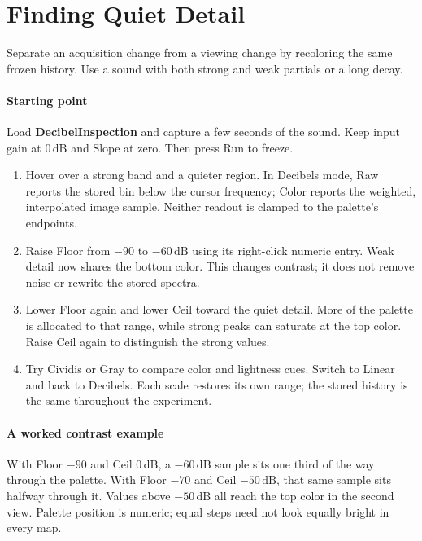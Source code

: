 \section{Finding Quiet Detail}\label{sec:detail}

Separate an acquisition change from a viewing change by recoloring the same
frozen history. Use a sound with both strong and weak partials or a long decay.

\paragraph{Starting point}
Load \textbf{DecibelInspection} and capture a few seconds of the sound.
Keep input gain at $0\,\mathrm{dB}$ and Slope at zero. Then press Run to freeze.

\begin{enumerate}
  \item Hover over a strong band and a quieter region. In Decibels mode,
  Raw reports the stored bin below the cursor frequency; Color reports the
  weighted, interpolated image sample. Neither readout is clamped to the
  palette's endpoints.
  \item Raise Floor from $-90$ to $-60\,\mathrm{dB}$ using its right-click
  numeric entry. Weak detail now shares the bottom color. This changes
  contrast; it does not remove noise or rewrite the stored spectra.
  \item Lower Floor again and lower Ceil toward the quiet detail. More of
  the palette is allocated to that range, while strong peaks can saturate at
  the top color. Raise Ceil again to distinguish the strong values.
  \item Try Cividis or Gray to compare color and lightness cues. Switch to
  Linear and back to Decibels. Each scale restores its own range; the stored
  history is the same throughout the experiment.
\end{enumerate}

\paragraph{A worked contrast example}
With Floor $-90$ and Ceil $0\,\mathrm{dB}$, a $-60\,\mathrm{dB}$ sample
sits one third of the way through the palette. With Floor $-70$ and Ceil
$-50\,\mathrm{dB}$, that same sample sits halfway through it. Values above
$-50\,\mathrm{dB}$ all reach the top color in the second view. Palette
position is numeric; equal steps need not look equally bright in every map.

